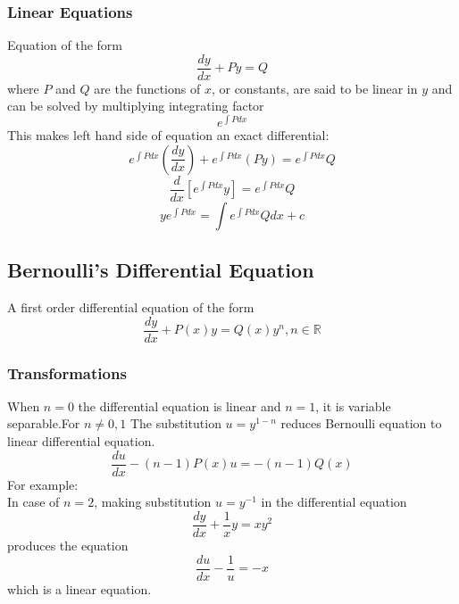 \documentclass[12pt]{article}
\begin{document}
\subsubsection{Linear Equations}
Equation of the form $$\frac{dy}{dx}+Py=Q$$ where $P$ and $Q$ are the functions of $x$, or constants, are said to be linear in $y$ and can be solved by multiplying integrating factor $$e^{\int Pdx}$$This makes left hand side of equation an exact differential:
$$e^{\int Pdx}(\frac{dy}{dx})+e^{\int Pdx}(Py)=e^{\int Pdx}Q$$
$$\frac{d}{dx}[e^{\int Pdx}y]=e^{\int Pdx}Q$$
$$ye^{\int Pdx}=\int e^{\int Pdx}Qdx+c$$
\subsection{Bernoulli's Differential Equation}
A first order differential equation of the form 
$$\frac{dy}{dx}+P(x)y=Q(x)y^n, n \in \mathbb{R}$$
\subsubsection{Transformations}
When $n=0$ the differential equation is linear and $n=1$, it is variable separable.For $n \not= 0,1$ The substitution $u=y^{1-n}$ reduces Bernoulli equation to linear differential equation.
$$\frac{du}{dx}-(n-1)P(x)u=-(n-1)Q(x)$$ 
For example: \\
In case of $n=2$, making substitution $u=y^{-1}$ in the differential equation 
$$\frac{dy}{dx}+\frac{1}{x}y=xy^2$$ produces the equation $$\frac{du}{dx}-\frac{1}{u}=-x$$ which is a linear equation.
\end{document}
